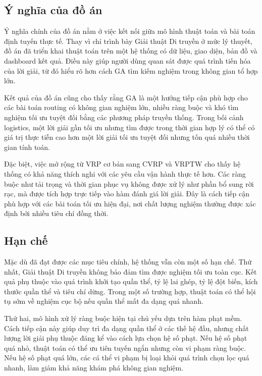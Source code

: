 \documentclass[12pt,a4paper]{article}
\numberwithin{figure}{subsection}
\begin{document}
\subsection{Ý nghĩa của đồ án}

Ý nghĩa chính của đồ án nằm ở việc kết nối giữa mô hình thuật toán và bài toán định tuyến thực tế. Thay vì chỉ trình bày Giải thuật Di truyền ở mức lý thuyết, đồ án đã triển khai thuật toán trên một hệ thống có dữ liệu, giao diện, bản đồ và dashboard kết quả. Điều này giúp người dùng quan sát được quá trình tiến hóa của lời giải, từ đó hiểu rõ hơn cách GA tìm kiếm nghiệm trong không gian tổ hợp lớn.

Kết quả của đồ án cũng cho thấy rằng GA là một hướng tiếp cận phù hợp cho các bài toán routing có không gian nghiệm lớn, nhiều ràng buộc và khó tìm nghiệm tối ưu tuyệt đối bằng các phương pháp truyền thống. Trong bối cảnh logistics, một lời giải gần tối ưu nhưng tìm được trong thời gian hợp lý có thể có giá trị thực tiễn cao hơn một lời giải tối ưu tuyệt đối nhưng tốn quá nhiều thời gian tính toán.

Đặc biệt, việc mở rộng từ VRP cơ bản sang CVRP và VRPTW cho thấy hệ thống có khả năng thích nghi với các yêu cầu vận hành thực tế hơn. Các ràng buộc như tải trọng và thời gian phục vụ không được xử lý như phần bổ sung rời rạc, mà được tích hợp trực tiếp vào hàm đánh giá lời giải. Đây là cách tiếp cận phù hợp với các bài toán tối ưu hiện đại, nơi chất lượng nghiệm thường được xác định bởi nhiều tiêu chí đồng thời.

\subsection{Hạn chế}

Mặc dù đã đạt được các mục tiêu chính, hệ thống vẫn còn một số hạn chế. Thứ nhất, Giải thuật Di truyền không bảo đảm tìm được nghiệm tối ưu toàn cục. Kết quả phụ thuộc vào quá trình khởi tạo quần thể, tỷ lệ lai ghép, tỷ lệ đột biến, kích thước quần thể và tiêu chí dừng. Trong một số trường hợp, thuật toán có thể hội tụ sớm về nghiệm cục bộ nếu quần thể mất đa dạng quá nhanh.

Thứ hai, mô hình xử lý ràng buộc hiện tại chủ yếu dựa trên hàm phạt mềm. Cách tiếp cận này giúp duy trì đa dạng quần thể ở các thế hệ đầu, nhưng chất lượng lời giải phụ thuộc đáng kể vào cách lựa chọn hệ số phạt. Nếu hệ số phạt quá nhỏ, thuật toán có thể ưu tiên tuyến ngắn nhưng còn vi phạm ràng buộc. Nếu hệ số phạt quá lớn, các cá thể vi phạm bị loại khỏi quá trình chọn lọc quá nhanh, làm giảm khả năng khám phá không gian nghiệm.
\end{document}
